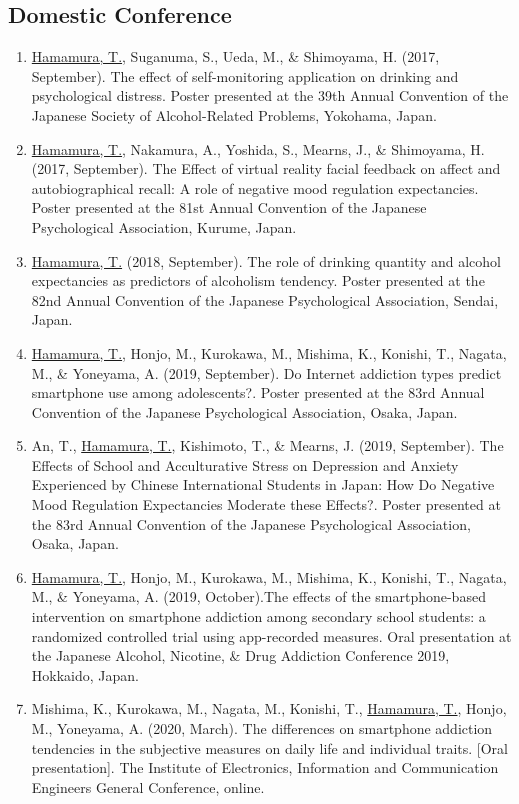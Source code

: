 \documentclass[a4paper]{article}
\begin{document}
\subsection{Domestic Conference}
\begin{enumerate}
	\item \underline{Hamamura, T.}, Suganuma, S., Ueda, M., \& Shimoyama, H. (2017, September). The effect of self-monitoring application on drinking and psychological distress. Poster presented at the 39th Annual Convention of the Japanese Society of Alcohol-Related Problems, Yokohama, Japan.
	\item \underline{Hamamura, T.}, Nakamura, A., Yoshida, S., Mearns, J., \& Shimoyama, H. (2017, September). The Effect of virtual reality facial feedback on affect and autobiographical recall: A role of negative mood regulation expectancies. Poster presented at the 81st Annual Convention of the Japanese Psychological Association, Kurume, Japan.
	\item \underline{Hamamura, T.} (2018, September). The role of drinking quantity and alcohol expectancies as predictors of alcoholism tendency. Poster presented at the 82nd Annual Convention of the Japanese Psychological Association, Sendai, Japan.
	\item \underline{Hamamura, T.}, Honjo, M., Kurokawa, M., Mishima, K., Konishi, T., Nagata, M., \& Yoneyama, A. (2019, September). Do Internet addiction types predict smartphone use among adolescents?. Poster presented at the 83rd Annual Convention of the Japanese Psychological Association, Osaka, Japan.
	\item An, T., \underline{Hamamura, T.}, Kishimoto, T., \& Mearns, J. (2019, September). The Effects of School and Acculturative Stress on Depression and Anxiety Experienced by Chinese International Students in Japan: How Do Negative Mood Regulation Expectancies Moderate these Effects?. Poster presented at the 83rd Annual Convention of the Japanese Psychological Association, Osaka, Japan.
	\item \underline{Hamamura, T.}, Honjo, M., Kurokawa, M., Mishima, K., Konishi, T., Nagata, M., \& Yoneyama, A. (2019, October).The effects of the smartphone-based intervention on smartphone addiction among secondary school students: a randomized controlled trial using app-recorded measures. Oral presentation at the Japanese Alcohol, Nicotine, \& Drug Addiction Conference 2019, Hokkaido, Japan.
	\item Mishima, K., Kurokawa, M., Nagata, M., Konishi, T., \underline{Hamamura, T.}, Honjo, M., Yoneyama, A. (2020, March). The differences on smartphone addiction tendencies in the subjective measures on daily life and individual traits. [Oral presentation]. The Institute of Electronics, Information and Communication Engineers General Conference, online.

\end{enumerate}
\end{document}
